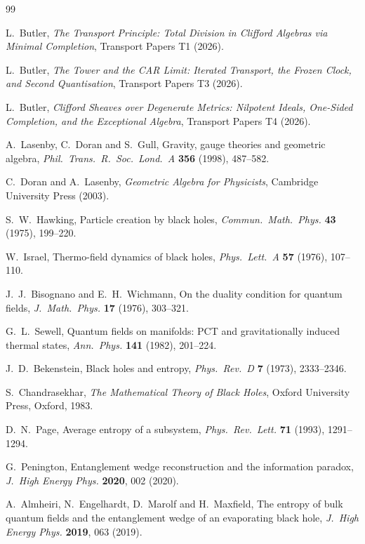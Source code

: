 \documentclass[11pt]{article}
\theoremstyle{definition}
\begin{document}
\begin{thebibliography}{99}

L.~Butler,
\emph{The Transport Principle: Total Division in Clifford Algebras via Minimal Completion},
Transport Papers T1 (2026).

L.~Butler,
\emph{The Tower and the CAR Limit: Iterated Transport, the Frozen Clock, and Second Quantisation},
Transport Papers T3 (2026).

L.~Butler,
\emph{Clifford Sheaves over Degenerate Metrics: Nilpotent Ideals, One-Sided Completion, and the Exceptional Algebra},
Transport Papers T4 (2026).

A.~Lasenby, C.~Doran and S.~Gull,
Gravity, gauge theories and geometric algebra,
\emph{Phil.\ Trans.\ R.\ Soc.\ Lond.\ A} \textbf{356} (1998), 487--582.

C.~Doran and A.~Lasenby,
\emph{Geometric Algebra for Physicists},
Cambridge University Press (2003).

S.~W.~Hawking,
Particle creation by black holes,
\emph{Commun.\ Math.\ Phys.} \textbf{43} (1975), 199--220.

W.~Israel,
Thermo-field dynamics of black holes,
\emph{Phys.\ Lett.\ A} \textbf{57} (1976), 107--110.

J.~J.~Bisognano and E.~H.~Wichmann,
On the duality condition for quantum fields,
\emph{J.\ Math.\ Phys.} \textbf{17} (1976), 303--321.

G.~L.~Sewell,
Quantum fields on manifolds: PCT and gravitationally induced thermal states,
\emph{Ann.\ Phys.} \textbf{141} (1982), 201--224.

J.~D.~Bekenstein,
Black holes and entropy,
\emph{Phys.\ Rev.\ D} \textbf{7} (1973), 2333--2346.

S.~Chandrasekhar,
\emph{The Mathematical Theory of Black Holes},
Oxford University Press, Oxford, 1983.

D.~N.~Page,
Average entropy of a subsystem,
\emph{Phys.\ Rev.\ Lett.} \textbf{71} (1993), 1291--1294.

G.~Penington,
Entanglement wedge reconstruction and the information paradox,
\emph{J.\ High Energy Phys.} \textbf{2020}, 002 (2020).

A.~Almheiri, N.~Engelhardt, D.~Marolf and H.~Maxfield,
The entropy of bulk quantum fields and the entanglement wedge of an evaporating black hole,
\emph{J.\ High Energy Phys.} \textbf{2019}, 063 (2019).


\end{thebibliography}
\end{document}
